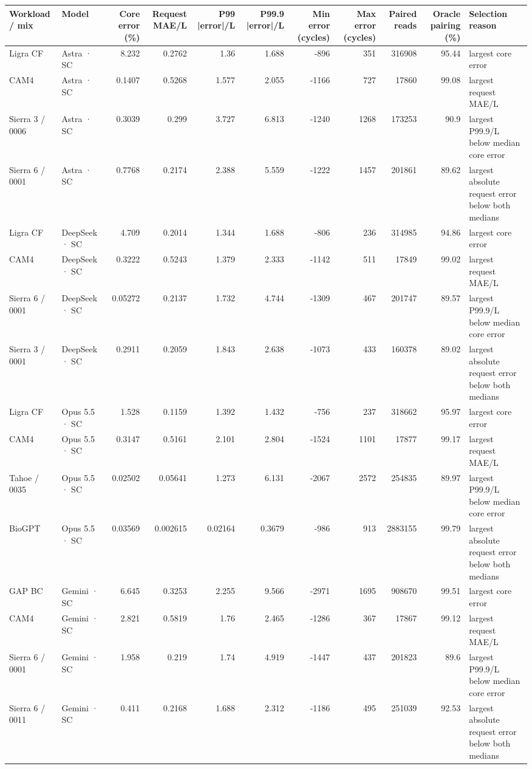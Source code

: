 \begin{tabular}{llrrrrrrrrl}
\toprule
Workload / mix & Model & Core error (\%) & Request MAE/L & P99 |error|/L & P99.9 |error|/L & Min error (cycles) & Max error (cycles) & Paired reads & Oracle pairing (\%) & Selection reason \\
\midrule
Ligra CF & Astra · SC & 8.232 & 0.2762 & 1.36 & 1.688 & -896 & 351 & 316908 & 95.44 & largest core error \\
CAM4 & Astra · SC & 0.1407 & 0.5268 & 1.577 & 2.055 & -1166 & 727 & 17860 & 99.08 & largest request MAE/L \\
Sierra 3 / 0006 & Astra · SC & 0.3039 & 0.299 & 3.727 & 6.813 & -1240 & 1268 & 173253 & 90.9 & largest P99.9/L below median core error \\
Sierra 6 / 0001 & Astra · SC & 0.7768 & 0.2174 & 2.388 & 5.559 & -1222 & 1457 & 201861 & 89.62 & largest absolute request error below both medians \\
Ligra CF & DeepSeek · SC & 4.709 & 0.2014 & 1.344 & 1.688 & -806 & 236 & 314985 & 94.86 & largest core error \\
CAM4 & DeepSeek · SC & 0.3222 & 0.5243 & 1.379 & 2.333 & -1142 & 511 & 17849 & 99.02 & largest request MAE/L \\
Sierra 6 / 0001 & DeepSeek · SC & 0.05272 & 0.2137 & 1.732 & 4.744 & -1309 & 467 & 201747 & 89.57 & largest P99.9/L below median core error \\
Sierra 3 / 0001 & DeepSeek · SC & 0.2911 & 0.2059 & 1.843 & 2.638 & -1073 & 433 & 160378 & 89.02 & largest absolute request error below both medians \\
Ligra CF & Opus 5.5 · SC & 1.528 & 0.1159 & 1.392 & 1.432 & -756 & 237 & 318662 & 95.97 & largest core error \\
CAM4 & Opus 5.5 · SC & 0.3147 & 0.5161 & 2.101 & 2.804 & -1524 & 1101 & 17877 & 99.17 & largest request MAE/L \\
Tahoe / 0035 & Opus 5.5 · SC & 0.02502 & 0.05641 & 1.273 & 6.131 & -2067 & 2572 & 254835 & 89.97 & largest P99.9/L below median core error \\
BioGPT & Opus 5.5 · SC & 0.03569 & 0.002615 & 0.02164 & 0.3679 & -986 & 913 & 2883155 & 99.79 & largest absolute request error below both medians \\
GAP BC & Gemini · SC & 6.645 & 0.3253 & 2.255 & 9.566 & -2971 & 1695 & 908670 & 99.51 & largest core error \\
CAM4 & Gemini · SC & 2.821 & 0.5819 & 1.76 & 2.465 & -1286 & 367 & 17867 & 99.12 & largest request MAE/L \\
Sierra 6 / 0001 & Gemini · SC & 1.958 & 0.219 & 1.74 & 4.919 & -1447 & 437 & 201823 & 89.6 & largest P99.9/L below median core error \\
Sierra 6 / 0011 & Gemini · SC & 0.411 & 0.2168 & 1.688 & 2.312 & -1186 & 495 & 251039 & 92.53 & largest absolute request error below both medians \\
\bottomrule
\end{tabular}
